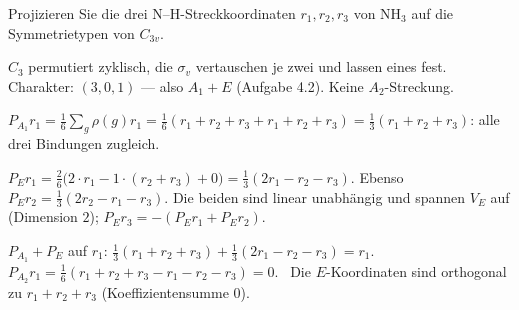 \begin{aufgabe}
Projizieren Sie die drei N--H-Streckkoordinaten $r_1, r_2, r_3$ von $\mathrm{NH_3}$ auf die Symmetrietypen von $C_{3v}$.

\loesung
{}
$C_3$ permutiert zyklisch, die $\sigma_v$ vertauschen je zwei und lassen eines fest. Charakter: $(3, 0, 1)$ --- also $A_1 + E$ (Aufgabe 4.2). Keine $A_2$-Streckung.

$P_{A_1}r_1 = \frac16\sum_g\rho(g)r_1 = \frac16(r_1 + r_2 + r_3 + r_1 + r_2 + r_3) = \frac13(r_1 + r_2 + r_3)$: alle drei Bindungen zugleich.

$P_Er_1 = \frac26\bigl(2\cdot r_1 - 1\cdot(r_2 + r_3) + 0\bigr) = \frac13(2r_1 - r_2 - r_3)$. Ebenso $P_Er_2 = \frac13(2r_2 - r_1 - r_3)$. Die beiden sind linear unabhängig und spannen $V_E$ auf (Dimension $2$); $P_Er_3 = -(P_Er_1 + P_Er_2)$.

$P_{A_1} + P_E$ auf $r_1$: $\frac13(r_1 + r_2 + r_3) + \frac13(2r_1 - r_2 - r_3) = r_1$. \checkmark\ $P_{A_2}r_1 = \frac16(r_1 + r_2 + r_3 - r_1 - r_2 - r_3) = 0$. \checkmark\ Die $E$-Koordinaten sind orthogonal zu $r_1 + r_2 + r_3$ (Koeffizientensumme $0$). \checkmark

\begin{center}
\begin{minipage}{0.88\textwidth}
\end{minipage}
\end{center}
\end{aufgabe}

